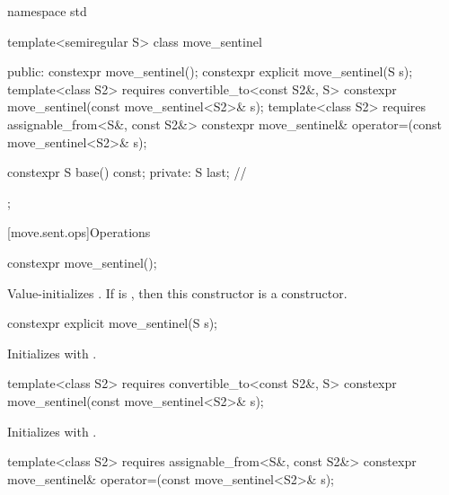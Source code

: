 %
\begin{codeblock}
namespace std {
  template<semiregular S>
  class move_sentinel {
  public:
    constexpr move_sentinel();
    constexpr explicit move_sentinel(S s);
    template<class S2>
      requires convertible_to<const S2&, S>
        constexpr move_sentinel(const move_sentinel<S2>& s);
    template<class S2>
      requires assignable_from<S&, const S2&>
        constexpr move_sentinel& operator=(const move_sentinel<S2>& s);

    constexpr S base() const;
  private:
    S last;     // \expos
  };
}
\end{codeblock}

[move.sent.ops]{Operations}

%
\begin{itemdecl}
constexpr move_sentinel();
\end{itemdecl}

\begin{itemdescr}
\pnum
\effects
Value-initializes .
If  is ,
then this constructor is a  constructor.
\end{itemdescr}

%
\begin{itemdecl}
constexpr explicit move_sentinel(S s);
\end{itemdecl}

\begin{itemdescr}
\pnum
\effects
Initializes  with .
\end{itemdescr}

%
\begin{itemdecl}
template<class S2>
  requires convertible_to<const S2&, S>
    constexpr move_sentinel(const move_sentinel<S2>& s);
\end{itemdecl}

\begin{itemdescr}
\pnum
\effects
Initializes  with .
\end{itemdescr}

%
%
\begin{itemdecl}
template<class S2>
  requires assignable_from<S&, const S2&>
    constexpr move_sentinel& operator=(const move_sentinel<S2>& s);
\end{itemdecl}

